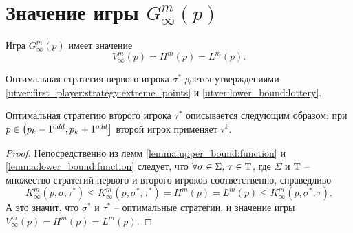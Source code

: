 \section{Значение игры $ G_\infty^m(p) $}
\begin{theorem}
\label{theorem:infinite_game:value}
Игра $ G_\infty^m(p) $ имеет значение 
\[
V_\infty^m(p) = H^m(p) = L^m(p).
\]

Оптимальная стратегия первого игрока $ \sigma^* $ дается утверждениями \ref{utver:first_player:strategy:extreme_points} и \ref{utver:lower_bound:lottery}.

Оптимальная стратегию второго игрока $ \tau^* $ описывается следующим образом: при $ p \in \left( p_k-1^{odd}, p_k+1^{odd} \right] $ второй игрок применяет $ \tau^k $.
\end{theorem}
\begin{proof}
Непосредственно из лемм \ref{lemma:upper_bound:function} и \ref{lemma:lower_bound:function} следует, что
$ \forall \sigma \in \Sigma, \, \tau \in \mathrm{T} $, где $ \Sigma $ и $ \mathrm{T} $ -- множество стратегий первого и второго игроков соответственно, справедливо
\[
  K_\infty^m(p, \sigma, \tau^*)
\leq K_\infty^m(p, \sigma^*, \tau^*) = H^m(p) = L^m(p) \leq 
  K_\infty^m(p, \sigma^*, \tau).
\]
А это значит, что $ \sigma^* $ и $ \tau^* $ -- оптимальные стратегии, и значение игры $ V_\infty^m(p) = H^m(p) = L^m(p) $.
\end{proof}